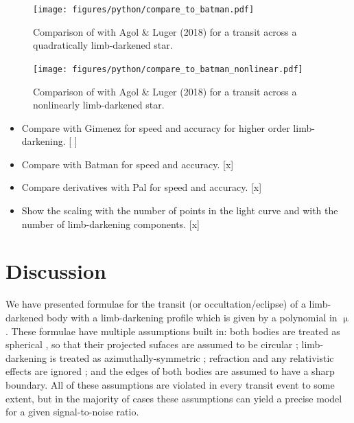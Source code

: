 \documentclass[modern]{aastex61}
\begin{document}
\begin{figure}
    \begin{centering}
    \texttt{[image: figures/python/compare\_to\_batman.pdf]}
    \caption{Comparison of \citet{Kreidberg2015} with Agol \& Luger (2018) for
             a transit across a quadratically limb-darkened star.
             }
    \label{fig:batman_comparison}
    \end{centering}
\end{figure}

\begin{figure}
    \begin{centering}
    \texttt{[image: figures/python/compare\_to\_batman\_nonlinear.pdf]}
    \caption{Comparison of \citet{Kreidberg2015} with Agol \& Luger (2018) for
             a transit across a nonlinearly limb-darkened star.
             }
    \label{fig:batman_nonlinear_comparison}
    \end{centering}
\end{figure}

\begin{itemize}
\item Compare with Gimenez for speed and accuracy for higher order limb-darkening. [ ]
\item Compare with Batman for speed and accuracy. [x]
\item Compare derivatives with Pal for speed and accuracy. [x]
\item Show the scaling with the number of points in the light curve
and with the number of limb-darkening components. [x]
\end{itemize}

\section{Discussion}

We have presented formulae for the transit (or occultation/eclipse) of a
limb-darkened body with a limb-darkening profile which is given by a polynomial
in $\upmu$.  These formulae have multiple assumptions built in:  both bodies
are treated as spherical \citep[but see][]{Seager2002,Hui2002}, so that their projected
sufaces are assumed to be circular \citep[but see][]{Barnes2003,Barnes2004,Barnes2009b,
DobbsDixon2012};  limb-darkening is treated as azimuthally-symmetric \citep[but see][]{Barnes2009a}; 
refraction and any relativistic effects are ignored \citep[but see][]{Sidis2010}; 
and the edges of both bodies are assumed to have a sharp boundary.
All of these assumptions are violated in every transit event to some extent,
but in the majority of cases these assumptions can yield a precise model for 
a given signal-to-noise ratio.
\end{document}
